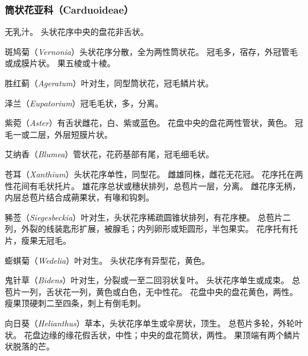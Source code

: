 \documentclass[11pt]{article}
\begin{document}
\begin{sloppypar}
\subsubsection{筒状花亚科（Carduoideae）}
无乳汁。
头状花序中央的盘花非舌状。

\par

斑鸠菊（\textit{Vernonia}）头状花序分散，全为两性筒状花。
冠毛多，宿存，外冠管毛或成膜片状。
果五棱或十棱。

\par

胜红蓟（\textit{Ageratum}）叶对生，同型筒状花，冠毛鳞片状。

\par

泽兰（\textit{Eupatorium}）冠毛毛状，多，分离。

\par

紫菀（\textit{Aster}）有舌状雌花，白、紫或蓝色。
花盘中央的盘花两性管状，黄色。
冠毛一或二层，外层短膜片状。

\par

艾纳香（\textit{Blumea}）管状花，花药基部有尾，冠毛细毛状。

\par

苍耳（\textit{Xanthium}）头状花序单性，同型花。
雌雄同株，雌花无花冠。
花序托在两性花间有毛状托片。
雄花序总状或穗状排列，总苞片一层，分离。
雌花序无柄，内层总苞片结合成蒴果状，有喙和钩刺。

\par

豨莶（\textit{Siegesbeckia}）叶对生，头状花序稀疏圆锥状排列，有花序梗。
总苞片二列，外裂的线装匙形扩展，被腺毛；内列卵形或矩圆形，半包果实。
花序托有托片，瘦果无冠毛。

\par

蟛蜞菊（\textit{Wedelia}）叶对生。
头状花序有异型花，黄色。

\par

鬼针草（\textit{Bidens}）叶对生，分裂或一至二回羽状复叶。
头状花序单生或成束。
总苞片一列，舌状花一列，黄色或白色，无中性花。
花盘中央的盘花黄色，两性。
瘦果顶硬刺二至四条，刺上有倒毛刺。

\par

向日葵（\textit{Helianthus}）草本，头状花序单生或伞房状，顶生。
总苞片多轮，外轮叶状。
花盘边缘的缘花假舌状，中性；中央的盘花筒状，两性。
果顶端有两个鳞片状脱落的芒。


\end{sloppypar}
\end{document}
